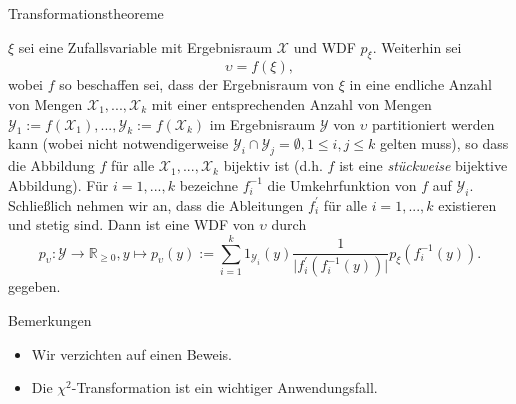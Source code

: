 \documentclass[
  8pt,
  ignorenonframetext,
]{beamer}
\providecommand{\tightlist}{%
  \setlength{\itemsep}{0pt}\setlength{\parskip}{0pt}}
\newcommand{\ups}{\upsilon}
\begin{document}
\begin{frame}{Transformationstheoreme}
\protect\hypertarget{transformationstheoreme-5}{}
\footnotesize
\begin{theorem}
\normalfont
\justifying
$\xi$ sei eine Zufallsvariable mit Ergebnisraum $\mathcal{X}$ und WDF $p_\xi$. Weiterhin sei
\begin{equation}
\ups = f(\xi),
\end{equation}
wobei $f$ so beschaffen sei, dass der Ergebnisraum von $\xi$ in eine endliche Anzahl
von Mengen $\mathcal{X}_1,...,\mathcal{X}_k$ mit einer entsprechenden Anzahl von
Mengen $\mathcal{Y}_1 := f(\mathcal{X}_1), ..., \mathcal{Y}_k :=  f(\mathcal{X}_k)$
im Ergebnisraum $\mathcal{Y}$ von $\ups$ partitioniert werden kann (wobei nicht
notwendigerweise $\mathcal{Y}_i \cap \mathcal{Y}_j = \emptyset, 1 \le i,j \le k$
gelten muss), so dass die Abbildung $f$ für alle $\mathcal{X}_1,...,\mathcal{X}_k$
bijektiv ist (d.h. $f$ ist eine \textit{stückweise} bijektive Abbildung). Für
$i = 1,...,k$ bezeichne $f_i^{-1}$ die Umkehrfunktion von $f$ auf $\mathcal{Y}_i$.
Schließlich nehmen wir an, dass die Ableitungen $f_i^{\prime}$ für alle $i=1,...,k$
existieren und stetig sind. Dann ist eine WDF von $\ups$ durch
\begin{equation}
p_\ups : \mathcal{Y} \to \mathbb{R}_{\ge 0}, y \mapsto p_\ups(y) :=
\sum_{i=1}^k 1_{\mathcal{Y}_i} (y) \frac{1}{\vert  f^{'}_i(f^{-1}_i(y)) \vert}p_\xi\left(f^{-1}_i(y)\right).
\end{equation}
gegeben.
\end{theorem}

Bemerkungen

\begin{itemize}
\tightlist
\item
  Wir verzichten auf einen Beweis.
\item
  Die \(\chi^2\)-Transformation ist ein wichtiger Anwendungsfall.
\end{itemize}
\end{frame}
\end{document}

